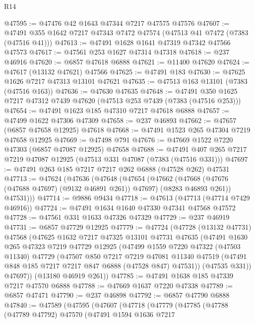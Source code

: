 \begin{lexlean}{R14}
\begin{coremodule}
@47595 := @47476 @42 @1643 @47344 @7217 @47575 @47576
@47607 := @47491 @355 @1642 @7217 @47343 @7472 @47574 (@47513 @41 @7472 (@7383 (@47516 @41)))
@47613 := @47491 @1628 @1641 @47319 @47342 @47566 @47573
@47617 := @47561 @253 @1627 @47314 @47318
@47618 := @237 @46916
@47620 := @6857 @47618 @6888
@47621 := @11400 @47620
@47624 := @47617 (@13132 @47621) @47566
@47625 := @47491 @183
@47630 := @47625 @1626 @7217 @47313 @13101 @47621
@47635 := @47513 @163 @13101 (@7383 (@47516 @163))
@47636 := @47630 @47635
@47648 := @47491 @350 @1625 @7217 @47312 @7439 @47620 (@47513 @253 @7439 (@7383 (@47516 @253)))
@47654 := @47491 @1623 @185 @47310 @7217 @47618 @6888
@47657 := @47499 @1622 @47306 @47309
@47658 := @237 @46893
@47662 := @47657 (@6857 @47658 @12925) @47618
@47668 := @47491 @1523 @265 @47304 @7219 @47658 @12925
@47669 := @47498 @791
@47676 := @47669 @1522 @7220 @47303 (@6857 @47087 @12925) @47658
@47688 := @47491 @407 @265 @7217 @7219 @47087 @12925 (@47513 @331 @47087 (@7383 (@47516 @331)))
@47697 := @47491 @263 @185 @7217 @7217 @262 @6888 (@47528 @262) @47531
@47713 := @47624
    (@47636
      (@47648
        (@47654
          (@47662 (@47668 (@47676 (@47688 @47697) (@9132 @46891 @261)) @47697) (@8283 @46893 @261))
          @47531)))
@47714 := @9886 @9434
@47718 := @47613 (@47713 (@47714 @7429 @46916))
@47724 := @47491 @1634 @1640 @47330 @47341 @47568 @47572
@47728 := @47561 @331 @1633 @47326 @47329
@47729 := @237 @46919
@47731 := @6857 @47729 @12925
@47779 := @47724
    (@47728
      (@13132 @47731)
      @47568
      (@47625
        @1632
        @7217
        @47325
        @13101
        @47731
        @47635
        (@47491
          @1630
          @265
          @47323
          @7219
          @47729
          @12925
          (@47499
            @1559
            @7220
            @47322
            (@47503 @11340)
            @47729
            (@47507
              @850
              @7217
              @7219
              @47081
              @11340
              @47519
              (@47491 @848 @185 @7217 @7217 @847 @6888 (@47528 @847) @47531))
            (@47535 @331))
          @47697))
      (@13180 @46919 @261))
@47785 := @47491 @1638 @185 @47339 @7217 @47570 @6888
@47788 := @47669 @1637 @7220 @47338
@47789 := @6857 @47471
@47790 := @237 @46898
@47792 := @6857 @47790 @6888
@47840 := @47589
    (@47595
      (@47607
        (@47718
          (@47779
            (@47785
              (@47788
                (@47789 @47792)
                @47570
                (@47491
                  @1594
                  @1636
                  @7217

\end{coremodule}
\end{lexlean}
